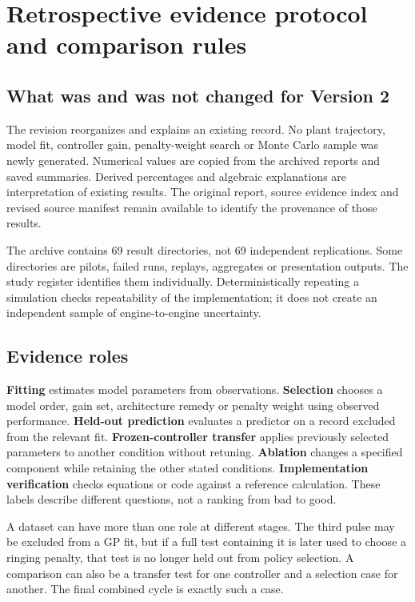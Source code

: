\chapter{Retrospective evidence protocol and comparison rules}
\label{ch:protocol}
\section{What was and was not changed for Version 2}
The revision reorganizes and explains an existing record. No plant trajectory, model fit, controller gain, penalty-weight search or Monte Carlo sample was newly generated. Numerical values are copied from the archived reports and saved summaries. Derived percentages and algebraic explanations are interpretation of existing results. The original report, source evidence index and revised source manifest remain available to identify the provenance of those results.

The archive contains 69 result directories, not 69 independent replications. Some directories are pilots, failed runs, replays, aggregates or presentation outputs. The study register identifies them individually. Deterministically repeating a simulation checks repeatability of the implementation; it does not create an independent sample of engine-to-engine uncertainty.

\section{Evidence roles}
\textbf{Fitting} estimates model parameters from observations. \textbf{Selection} chooses a model order, gain set, architecture remedy or penalty weight using observed performance. \textbf{Held-out prediction} evaluates a predictor on a record excluded from the relevant fit. \textbf{Frozen-controller transfer} applies previously selected parameters to another condition without retuning. \textbf{Ablation} changes a specified component while retaining the other stated conditions. \textbf{Implementation verification} checks equations or code against a reference calculation. These labels describe different questions, not a ranking from bad to good.

A dataset can have more than one role at different stages. The third pulse may be excluded from a GP fit, but if a full test containing it is later used to choose a ringing penalty, that test is no longer held out from policy selection. A comparison can also be a transfer test for one controller and a selection case for another. The final combined cycle is exactly such a case.

